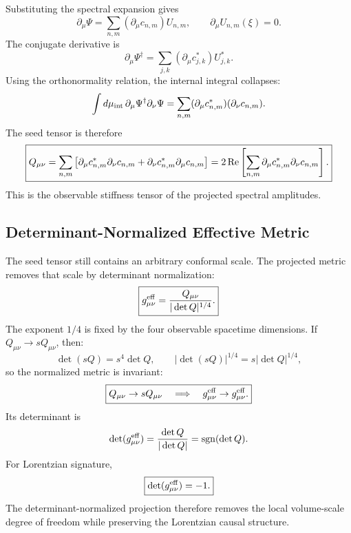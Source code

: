 \documentclass[11pt]{article}
\begin{document}
Substituting the spectral expansion gives
\begin{equation}
\partial_\mu\Psi
=
\sum_{n,m}
(\partial_\mu c_{n,m})U_{n,m},
\qquad
\partial_\mu U_{n,m}(\xi)=0.
\end{equation}
The conjugate derivative is
\begin{equation}
\partial_\mu\Psi^\dagger
=
\sum_{j,k}
(\partial_\mu c_{j,k}^{*})U_{j,k}^{*}.
\end{equation}
Using the orthonormality relation, the internal integral collapses:
\begin{equation}
\int d\mu_{\rm int}\,
\partial_\mu\Psi^\dagger\partial_\nu\Psi
=
\sum_{n,m}
(\partial_\mu c_{n,m}^{*})
(\partial_\nu c_{n,m}).
\end{equation}
The seed tensor is therefore
\begin{equation}
\boxed{
Q_{\mu\nu}
=
\sum_{n,m}
\left[
\partial_\mu c_{n,m}^{*}
\partial_\nu c_{n,m}
+
\partial_\nu c_{n,m}^{*}
\partial_\mu c_{n,m}
\right]
=
2\,{\rm Re}
\left[
\sum_{n,m}
\partial_\mu c_{n,m}^{*}
\partial_\nu c_{n,m}
\right].
}
\end{equation}
This is the observable stiffness tensor of the projected spectral amplitudes.

\subsection{Determinant-Normalized Effective Metric}

The seed tensor still contains an arbitrary conformal scale. The projected
metric removes that scale by determinant normalization:
\begin{equation}
\boxed{
g_{\mu\nu}^{\rm eff}
=
\frac{Q_{\mu\nu}}{|\det Q|^{1/4}}.
}
\end{equation}
The exponent \(1/4\) is fixed by the four observable spacetime dimensions. If
\(Q_{\mu\nu}\rightarrow sQ_{\mu\nu}\), then:
\begin{equation}
\det(sQ)=s^4\det Q,
\qquad
|\det(sQ)|^{1/4}=s|\det Q|^{1/4},
\end{equation}
so the normalized metric is invariant:
\begin{equation}
\boxed{
Q_{\mu\nu}\rightarrow sQ_{\mu\nu}
\quad
\Longrightarrow
\quad
g_{\mu\nu}^{\rm eff}\rightarrow g_{\mu\nu}^{\rm eff}.
}
\end{equation}
Its determinant is
\begin{equation}
\det(g_{\mu\nu}^{\rm eff})
=
\frac{\det Q}{|\det Q|}
=
{\rm sgn}(\det Q).
\end{equation}
For Lorentzian signature,
\begin{equation}
\boxed{
\det(g_{\mu\nu}^{\rm eff})=-1.
}
\end{equation}
The determinant-normalized projection therefore removes the local volume-scale
degree of freedom while preserving the Lorentzian causal structure.
\end{document}
